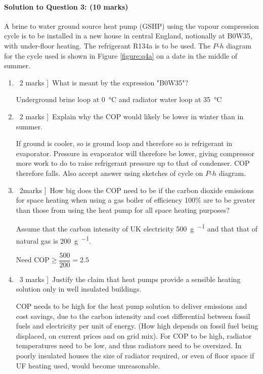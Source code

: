 \documentclass[a4paper,12pt,fleqn]{article}
\begin{document}
\paragraph{\textbf{Solution to Question 3: (10 marks)}}

A brine to water ground source heat pump (GSHP) using the vapour compression cycle is to be installed in a new house in central England, notionally at B0W35, with under-floor heating. The refrigerant R134a is to be used. The $P$-$h$ diagram for the cycle used is shown in Figure \ref{figure:q4a} on a date in the middle of summer.

\begin{enumerate} [label=\alph*)]
\item \lbrack\ 2 marks ]\ What is meant by the expression "B0W35"?\par
Underground brine loop at \SI{0}{\celsius} and radiator water loop at \SI{35}{\celsius}
\item \lbrack\ 2 marks ]\ Explain why the COP would likely be lower in winter than in summer.\par
If ground is cooler, so is ground loop and therefore so is refrigerant in evaporator. Pressure in evaporator will therefore be lower, giving compressor more work to do to raise refrigerant pressure up to that of condenser. COP therefore falls. Also accept answer using sketches of cycle on $P$-$h$ diagram.
\item \lbrack\ 2marks ]\ How big does the COP need to be if the carbon dioxide emissions for space heating when using a gas boiler of efficiency 100\% are to be greater than those from using the heat pump for all space heating purposes? \par
Assume that the carbon intensity of UK electricity \SI{500}{\gram\per\kilowatthour} and that that of natural gas is \SI{200}{\gram\per\kilowatthour}.\par
Need $\mathrm{COP}\geq \dfrac{500}{200}=2.5$

\item \lbrack\ 3 marks ]\ Justify the claim that heat pumps provide a sensible heating solution only in well insulated buildings.\par
COP needs to be high for the heat pump solution to deliver emissions and cost savings, due to the carbon intensity and cost differential between fossil fuels and electricity per unit of energy. (How high depends on fossil fuel being displaced, on current prices and on grid mix). For COP to be high, radiator temperatures need to be low, and thus radiators need to be oversized. In poorly insulated houses the size of radiator required, or even of floor space if UF heating used, would become unreasonable.
\end{enumerate}

\end{document}
